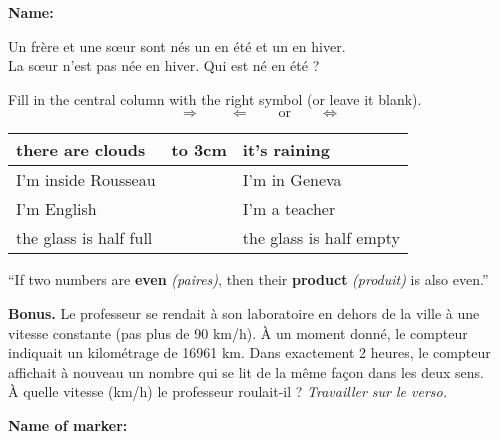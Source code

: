 \documentclass[12pt]{exam}
\begin{document}
\textbf{Name:} \dotfill

\begin{questions}


\question[1] Un frère et une sœur sont nés un en été et un en hiver. \\
La sœur n'est pas née en hiver.
Qui est né en été ?

\fillwithdottedlines{7mm}

\question[4] Fill in the central column with the right symbol (or leave it blank).
\vspace{-4mm}
$$ \Rightarrow \qquad \Leftarrow \qquad \mathrm{or} \qquad  \Leftrightarrow$$
\vspace{-12mm}
\begin{center}
\begin{tabular}{|l|l|l|}
\hline
there are clouds           & \hbox to 3cm{} & it's raining              \\ \hline
I'm inside Rousseau         &  & I'm in Geneva      \\ \hline
I'm English             &  & I'm a teacher       \\ \hline
the glass is half full &  & the glass is half empty \\ \hline
\end{tabular}
\end{center}

\question[4] ``If two numbers are \textbf{even} \emph{(paires)}, then their \textbf{product} \emph{(produit)} is also even.''

\question \textbf{Bonus.} Le professeur se rendait à son laboratoire en dehors de la ville à une vitesse constante (pas plus de 90 km/h).
À un moment donné, le compteur indiquait un kilométrage de 16961 km. Dans exactement 2 heures, le compteur affichait à nouveau un nombre qui se lit de la même façon dans les deux sens. \\
À quelle vitesse (km/h) le professeur roulait-il ? \hfill \emph{Travailler sur le verso.}

\end{questions}

\vfill

\begin{tcolorbox}

\textbf{Name of marker:}

\begin{center}
\gradetable[h][questions]
\end{center}

\end{tcolorbox}
\end{document}
